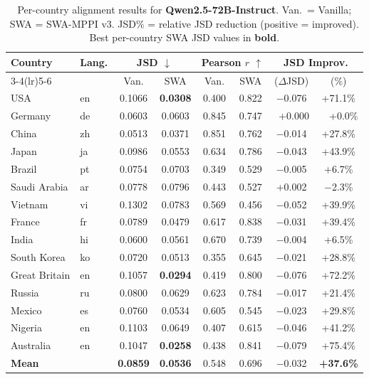 \documentclass{article}
\newcommand{\gain}[1]{\textcolor{improvegreen}{#1}}
\newcommand{\loss}[1]{\textcolor{worsered}{#1}}
\begin{document}
\begin{table}[t]
\caption{Per-country alignment results for \textbf{Qwen2.5-72B-Instruct}.
Van.\ = Vanilla; SWA = SWA-MPPI v3. JSD\% = relative JSD reduction
(positive = improved). Best per-country SWA JSD values in \textbf{bold}.}
\label{tab:results_qwen}
\centering
\setlength{\tabcolsep}{4.5pt}
\footnotesize
\begin{tabular}{llcccccc}
\toprule
\multirow{2}{*}{Country} & \multirow{2}{*}{Lang.} &
  \multicolumn{2}{c}{JSD $\downarrow$} &
  \multicolumn{2}{c}{Pearson $r$ $\uparrow$} &
  \multicolumn{2}{c}{JSD Improv.} \\
\cmidrule(lr){3-4}\cmidrule(lr){5-6}
 & & Van. & SWA & Van. & SWA & ($\Delta$JSD) & (\%) \\
\midrule
USA         & en & 0.1066 & \textbf{0.0308} & 0.400 & 0.822 & $-$0.076 & \gain{+71.1\%} \\
Germany     & de & 0.0603 & 0.0603          & 0.845 & 0.747 & ~+0.000  & ~~+0.0\% \\
China       & zh & 0.0513 & 0.0371          & 0.851 & 0.762 & $-$0.014 & \gain{+27.8\%} \\
Japan       & ja & 0.0986 & 0.0553          & 0.634 & 0.786 & $-$0.043 & \gain{+43.9\%} \\
Brazil      & pt & 0.0754 & 0.0703          & 0.349 & 0.529 & $-$0.005 & \gain{+6.7\%}  \\
Saudi Arabia& ar & 0.0778 & 0.0796          & 0.443 & 0.527 & +0.002   & \loss{$-$2.3\%}\\
Vietnam     & vi & 0.1302 & 0.0783          & 0.569 & 0.456 & $-$0.052 & \gain{+39.9\%} \\
France      & fr & 0.0789 & 0.0479          & 0.617 & 0.838 & $-$0.031 & \gain{+39.4\%} \\
India       & hi & 0.0600 & 0.0561          & 0.670 & 0.739 & $-$0.004 & \gain{+6.5\%}  \\
South Korea & ko & 0.0720 & 0.0513          & 0.355 & 0.645 & $-$0.021 & \gain{+28.8\%} \\
Great Britain& en& 0.1057 & \textbf{0.0294} & 0.419 & 0.800 & $-$0.076 & \gain{+72.2\%} \\
Russia      & ru & 0.0800 & 0.0629          & 0.623 & 0.784 & $-$0.017 & \gain{+21.4\%} \\
Mexico      & es & 0.0760 & 0.0534          & 0.605 & 0.545 & $-$0.023 & \gain{+29.8\%} \\
Nigeria     & en & 0.1103 & 0.0649          & 0.407 & 0.615 & $-$0.046 & \gain{+41.2\%} \\
Australia   & en & 0.1047 & \textbf{0.0258} & 0.438 & 0.841 & $-$0.079 & \gain{+75.4\%} \\
\midrule
\textbf{Mean} & & \textbf{0.0859} & \textbf{0.0536} & 0.548 & 0.696 & $-$0.032 & \gain{\textbf{+37.6\%}} \\
\bottomrule
\end{tabular}
\end{table}
\end{document}
